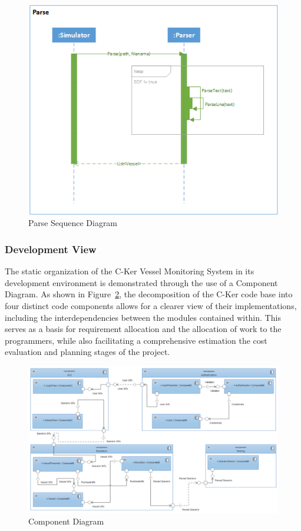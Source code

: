 \documentclass[12pt]{article}
\begin{document}
\begin{figure}[h!]
    \centering
    \includegraphics[scale=1]{2_1_parse}
    \caption{Parse Sequence Diagram}
    \label{fig:ParseSequenceDiagram}
\end{figure}

\clearpage


\subsubsection{Development View}
\par
The static organization of the C-Ker Vessel Monitoring System in its development environment is demonstrated through the use of a Component Diagram. As shown in Figure~\ref{fig:UMLComponentDiagram}, the decomposition of the C-Ker code base into four distinct code components allows for a clearer view of their implementations, including the interdependencies between the modules contained within. This serves as a basis for requirement allocation and the allocation of work to the programmers, while also facilitating a comprehensive estimation the cost evaluation and planning stages of the project.

\begin{figure}[h!]
    \centering
    \includegraphics[scale=0.5]{section_2_component_diagram}
    \caption{Component Diagram}
    \label{fig:UMLComponentDiagram}
\end{figure}
\clearpage
\end{document}

